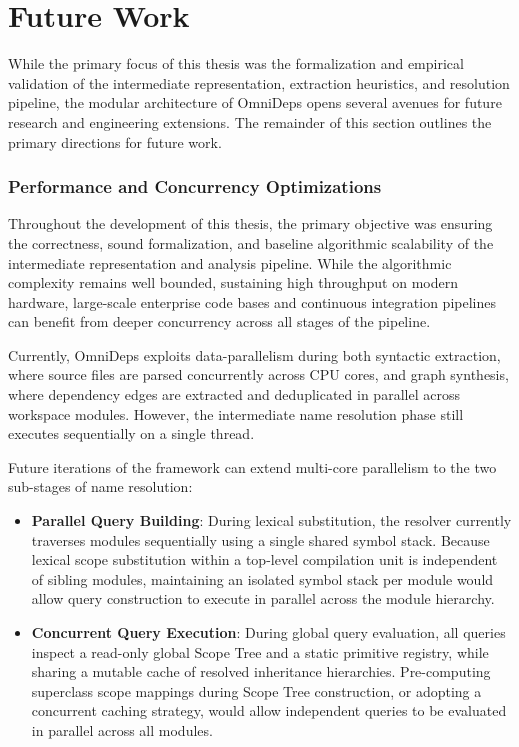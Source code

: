 \section{Future Work}
\label{ch:future_work}

While the primary focus of this thesis was the formalization and empirical
validation of the intermediate representation, extraction heuristics, and
resolution pipeline, the modular architecture of OmniDeps opens several avenues
for future research and engineering extensions. The remainder of this section
outlines the primary directions for future work.

\subsubsection{Performance and Concurrency Optimizations}
\label{subsec:future_performance}

Throughout the development of this thesis, the primary objective was ensuring
the correctness, sound formalization, and baseline algorithmic scalability of
the intermediate representation and analysis pipeline. While the algorithmic
complexity remains well bounded, sustaining high throughput on modern hardware,
large-scale enterprise code bases and continuous integration pipelines can
benefit from deeper concurrency across all stages of the pipeline.

Currently, OmniDeps exploits data-parallelism during both syntactic extraction,
where source files are parsed concurrently across CPU cores, and graph
synthesis, where dependency edges are extracted and deduplicated in parallel
across workspace modules. However, the intermediate name resolution phase still
executes sequentially on a single thread.

Future iterations of the framework can extend multi-core parallelism to the two
sub-stages of name resolution:
\begin{itemize}
  \item \textbf{Parallel Query Building}: During lexical substitution, the
    resolver currently traverses modules sequentially using a single shared
    symbol stack. Because lexical scope substitution within a top-level
    compilation unit is independent of sibling modules, maintaining an isolated
    symbol stack per module would allow query construction to execute in
    parallel across the module hierarchy.
  \item \textbf{Concurrent Query Execution}: During global query evaluation,
    all queries inspect a read-only global Scope Tree and a static primitive
    registry, while sharing a mutable cache of resolved inheritance
    hierarchies. Pre-computing superclass scope mappings during Scope Tree
    construction, or adopting a concurrent caching strategy, would allow
    independent queries to be evaluated in parallel across all modules.
\end{itemize}

